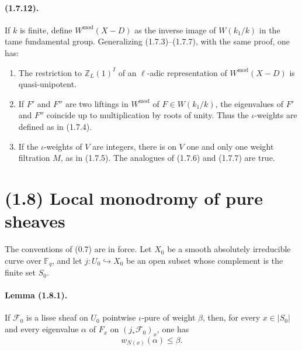 \documentclass[11pt]{article}
\theoremstyle{remark}
\newcommand{\ZZ}{\mathbb{Z}}
\newcommand{\Fq}{\mathbb{F}_q}
\begin{document}
\paragraph{(1.7.12).}
If $k$ is finite, define $W^{\mathrm{mod}}(X-D)$ as the inverse image of $W(k_1/k)$ in the tame fundamental group. Generalizing (1.7.3)--(1.7.7), with the same proof, one has:
\begin{enumerate}[label=(1.7.12.\arabic*)]
\item The restriction to $\ZZ_L(1)^I$ of an $\ell$-adic representation of $W^{\mathrm{mod}}(X-D)$ is quasi-unipotent.
\item If $F'$ and $F''$ are two liftings in $W^{\mathrm{mod}}$ of $F\in W(k_1/k)$, the eigenvalues of $F'$ and $F''$ coincide up to multiplication by roots of unity. Thus the $\iota$-weights are defined as in (1.7.4).
\item If the $\iota$-weights of $V$ are integers, there is on $V$ one and only one weight filtration $M$, as in (1.7.5). The analogues of (1.7.6) and (1.7.7) are true.
\end{enumerate}

\section*{(1.8) Local monodromy of pure sheaves}

The conventions of (0.7) are in force. Let $X_0$ be a smooth absolutely irreducible curve over $\Fq$, and let $j:U_0\hookrightarrow X_0$ be an open subset whose complement is the finite set $S_0$.

\paragraph{Lemma (1.8.1).}
If $\mathcal F_0$ is a lisse sheaf on $U_0$ pointwise $\iota$-pure of weight $\beta$, then, for every $x\in |S_0|$ and every eigenvalue $\alpha$ of $F_x$ on $(j_{*}\mathcal F_0)_x$, one has
\[
w_{N(x)}(\alpha)\le \beta.
\]
\end{document}

